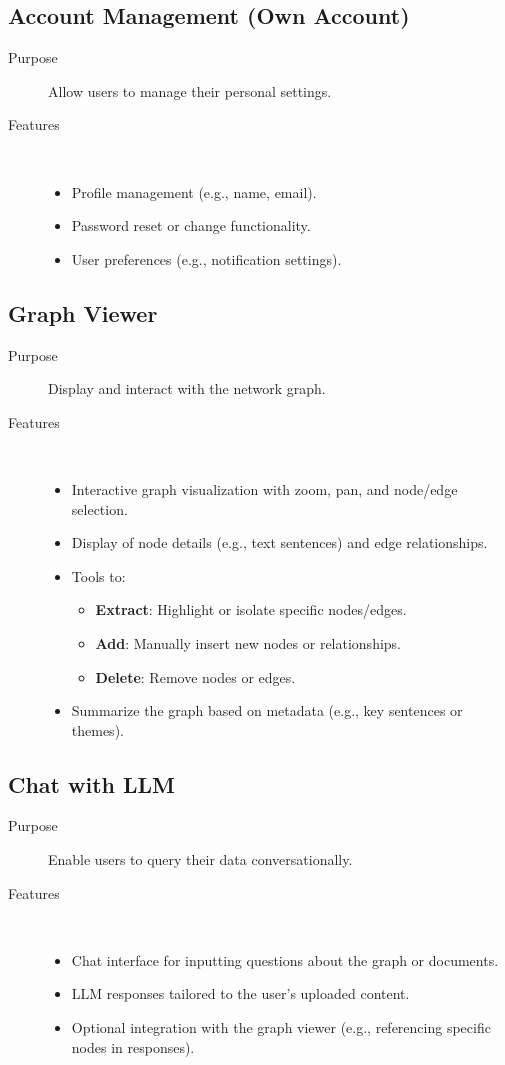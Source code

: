 \documentclass[%
 reprint,
 amsmath,amssymb,
 aps,
]{revtex4-2}
\begin{document}
\subsection{\label{sec:account_management}Account Management (Own Account)}
\begin{description}
\item[Purpose] Allow users to manage their personal settings.
\item[Features] ~
\begin{itemize}
\item Profile management (e.g., name, email).
\item Password reset or change functionality.
\item User preferences (e.g., notification settings).
\end{itemize}
\end{description}

\subsection{\label{sec:graph_viewer}Graph Viewer}
\begin{description}
\item[Purpose] Display and interact with the network graph.
\item[Features] ~
\begin{itemize}
\item Interactive graph visualization with zoom, pan, and node/edge selection.
\item Display of node details (e.g., text sentences) and edge relationships.
\item Tools to:
\begin{itemize}
\item \textbf{Extract}: Highlight or isolate specific nodes/edges.
\item \textbf{Add}: Manually insert new nodes or relationships.
\item \textbf{Delete}: Remove nodes or edges.
\end{itemize}
\item Summarize the graph based on metadata (e.g., key sentences or themes).
\end{itemize}
\end{description}

\subsection{\label{sec:chat_llm}Chat with LLM}
\begin{description}
\item[Purpose] Enable users to query their data conversationally.
\item[Features] ~
\begin{itemize}
\item Chat interface for inputting questions about the graph or documents.
\item LLM responses tailored to the user's uploaded content.
\item Optional integration with the graph viewer (e.g., referencing specific nodes in responses).
\end{itemize}
\end{description}
\end{document}
